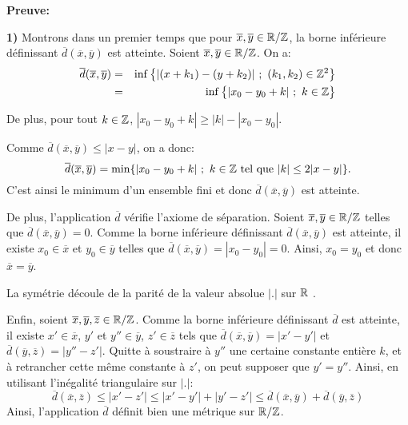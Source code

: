 	\textbf{Preuve:}
	\par\textbf{1)} Montrons dans un premier temps que pour $\overline{x}, \overline{y} \in {\mathbb{R}}/{\mathbb{Z}}$, la borne inférieure définissant $\overline{d}(\overline{x},\overline{y})$ est atteinte. Soient $\overline{x}, \overline{y}\in {\mathbb{R}}/{\mathbb{Z}}$. On a:
	\begin{eqnarray*}
			\overline{d}(\overline{x},\overline{y})&=&\inf\big\lbrace |(x+k_1)-(y+k_2)|\ ;\ (k_1,k_2)\in {\mathbb{Z}}^2\big\rbrace\\
			&=&\inf \big\lbrace |x_0-y_0+k|\ ;\ k \in {\mathbb{Z}}\big\rbrace
	\end{eqnarray*}


	De plus, pour  tout $k \in {\mathbb{Z}}$, $|x_0-y_0 +k|\geq |k|-|x_0-y_0|$.

	Comme $\overline{d}(\overline{x},\overline{y})\leq |x-y|$, on a donc:
	$$\overline{d}(\overline{x},\overline{y})= \min \lbrace |x_0-y_0+k|\ ;\ k \in {\mathbb{Z}} \text{ tel que } |k|\leq 2|x-y|\rbrace.$$
	C'est ainsi le minimum d'un ensemble fini et donc $\overline{d}(\overline{x},\overline{y})$ est atteinte.\\

	\par De plus, l'application $\overline{d}$ vérifie l'axiome de séparation. Soient $\overline{x}, \overline{y} \in {\mathbb{R}}/{\mathbb{Z}}$ telles que $\overline{d}(\overline{x},\overline{y}) = 0$. Comme la borne inférieure définissant $\overline{d}(\overline{x},\overline{y})$ est atteinte, il existe $x_0 \in \overline{x}$ et $y_0 \in \overline{y}$ telles que $\overline{d}(\overline{x},\overline{y})=|x_0-y_0|=0$. Ainsi, $x_0=y_0$ et donc $\overline{x}= \overline{y}$.\\

	\par La symétrie découle de la parité de la valeur absolue $|.|$ sur ${\mathbb{R}}$ .\\

	\par Enfin, soient $\overline{x},\overline{y}, \overline{z} \in {\mathbb{R}}/{\mathbb{Z}}$. Comme la borne inférieure définissant $\overline{d}$ est atteinte, il existe $x'\in \overline{x}$, $y'$ et $y'' \in \overline{y}$, $z' \in \overline{z}$ tels que $\overline{d}(\overline{x},\overline{y})=|x'-y'|$ et $\overline{d}(\overline{y},\overline{z})=|y''-z'|$. Quitte à soustraire à $y''$ une certaine constante entière $k$, et à retrancher cette même constante à $z'$, on peut supposer que $y'=y''$. Ainsi, en utilisant l'inégalité triangulaire sur $|.|$:
	$$\overline{d}(\overline{x},\overline{z})\leq |x'-z'| \leq |x'-y'|+|y'-z'|\leq \overline{d}(\overline{x},\overline{y})+\overline{d}(\overline{y},\overline{z})$$
	Ainsi, l'application $\overline{d}$ définit bien une métrique sur ${\mathbb{R}}/{\mathbb{Z}}$.\\

